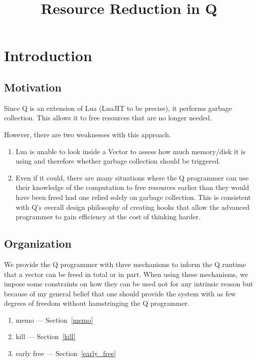 \documentclass[letterpaper,12pt]{article}
\newcommand{\be}{\begin{enumerate}}
\newcommand{\ee}{\end{enumerate}}
\begin{document}
\title{Resource Reduction in Q}
\maketitle
\thispagestyle{fancy}
\lhead{}
\chead{}
\rhead{}
\cfoot{}
\rfoot{{\small \thepage}}


\section{Introduction}

\subsection{Motivation}
Since Q is an extension of Lua (LuaJIT to be precise), it performs garbage
collection. This allows it to free resources that are no longer needed.

However, there are two weaknesses with this approach. 
\be
\item Lua is unable to look inside a Vector to assess how much 
memory/disk it is using and therefore whether garbage collection should 
be triggered. 
\item Even if it could, there are many  situations where the Q programmer can
use their knowledge of the computation to free resources earlier than they would
have been freed had one relied solely on garbage collection. This is consistent
with Q's overall design philosophy of creating hooks that allow the 
advanced programmer to gain efficiency at the cost of thinking harder.
\ee

\subsection{Organization}
We provide the Q programmer with three mechanisms to inform the Q runtime 
that a vector can be freed in total or in part. When using these 
mechanisms, we impose some constraints on how they can be used not for 
any intrinsic reason but because of my general belief that one should 
provide the system with as few degrees of freedom without 
hamstringing the Q programmer. 

\be
\item memo --- Section~\ref{memo}
\item kill --- Section~\ref{kill}
\item early free --- Section~\ref{early_free}
\ee
\end{document}

